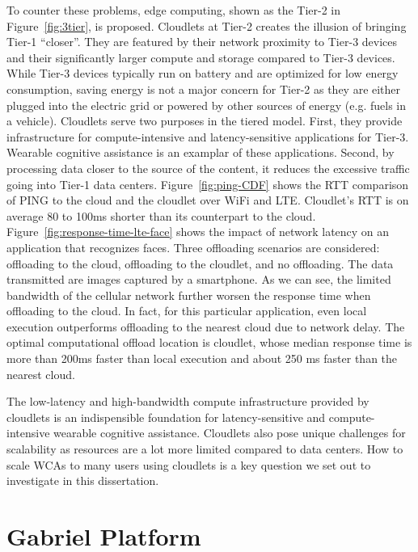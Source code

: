 To counter these problems, edge computing, shown as the Tier-2 in
Figure~\ref{fig:3tier}, is proposed. Cloudlets at Tier-2 creates the illusion of
bringing Tier-1 ``closer''. They are featured by their network proximity to
Tier-3 devices and their significantly larger compute and storage compared to
Tier-3 devices. While Tier-3 devices typically run on battery and are optimized
for low energy consumption, saving energy is not a major concern for Tier-2 as
they are either plugged into the electric grid or powered by other sources of
energy (e.g. fuels in a vehicle). Cloudlets serve two purposes in the tiered
model. First, they provide infrastructure for compute-intensive and
latency-sensitive applications for Tier-3. Wearable cognitive assistance is an
examplar of these applications. Second, by processing data closer to the source
of the content, it reduces the excessive traffic going into Tier-1 data centers.
Figure~\ref{fig:ping-CDF} shows the RTT comparison of PING to the cloud and the
cloudlet over WiFi and LTE. Cloudlet's RTT is on average 80 to 100ms shorter
than its counterpart to the cloud. Figure~\ref{fig:response-time-lte-face} shows
the impact of network latency on an application that recognizes faces. Three
offloading scenarios are considered: offloading to the cloud, offloading to the
cloudlet, and no offloading. The data transmitted are images captured by a
smartphone. As we can see, the limited bandwidth of the cellular network further
worsen the response time when offloading to the cloud. In fact, for this
particular application, even local execution outperforms offloading to the
nearest cloud due to network delay. The optimal computational offload location
is cloudlet, whose median response time is more than 200ms faster than local
execution and about 250 ms faster than the nearest cloud.

The low-latency and high-bandwidth compute infrastructure provided by cloudlets
is an indispensible foundation for latency-sensitive and compute-intensive
wearable cognitive assistance. Cloudlets also pose unique challenges for
scalability as resources are a lot more limited compared to data centers. How to
scale WCAs to many users using cloudlets is a key question we set out to
investigate in this dissertation.


\section{Gabriel Platform}
\label{sec: bg-gabriel}

